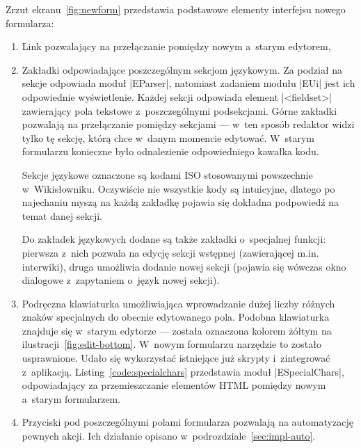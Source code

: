 Zrzut ekranu~\ref{fig:newform} przedstawia podstawowe elementy interfejsu nowego formularza:
\begin{enumerate}
\item Link pozwalający na przełączanie pomiędzy nowym a~starym edytorem,
\item Zakładki odpowiadające poszczególnym sekcjom językowym. Za podział na sekcje odpowiada moduł \kod|EParser|, natomiast zadaniem modułu \kod|EUi| jest ich odpowiednie wyświetlenie. Każdej sekcji odpowiada element \kod|<fieldset>| zawierający pola tekstowe z~poszczególnymi podsekcjami. Górne zakładki pozwalają na przełączanie pomiędzy sekcjami --- w~ten sposób redaktor widzi tylko tę sekcję, którą chce w~danym momencie edytować. W~starym formularzu konieczne było odnalezienie odpowiedniego kawałka kodu.

Sekcje językowe oznaczone są kodami ISO stosowanymi powszechnie w~Wikisłowniku. Oczywiście nie wszystkie kody są intuicyjne, dlatego po najechaniu myszą na każdą zakładkę pojawia się dokładna podpowiedź na temat danej sekcji.

Do zakładek językowych dodane są także zakładki o~specjalnej funkcji: pierwsza z~nich pozwala na edycję sekcji wstępnej (zawierającej m.in. interwiki), druga umożliwia dodanie nowej sekcji (pojawia się wówczas okno dialogowe z~zapytaniem o~język nowej sekcji).
\item Podręczna klawiaturka umożliwiająca wprowadzanie dużej liczby różnych znaków specjalnych do obecnie edytowanego pola. Podobna klawiaturka znajduje się w~starym edytorze --- została oznaczona kolorem żółtym na ilustracji~\ref{fig:edit-bottom}. W~nowym formularzu narzędzie to zostało usprawnione. Udało się wykorzystać istniejące już skrypty i~zintegrować z~aplikacją. Listing~\ref{code:specialchars} przedstawia moduł \kod|ESpecialChars|, odpowiadający za przemieszczanie elementów HTML pomiędzy nowym a~starym formularzem.
\item Przyciski pod poszczególnymi polami formularza pozwalają na automatyzację pewnych akcji. Ich działanie opisano w~podrozdziale~\ref{sec:impl-auto}.
\end{enumerate}

